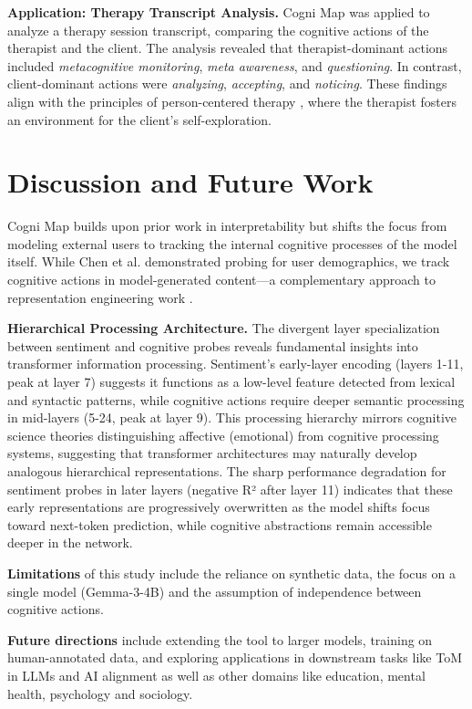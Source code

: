 \documentclass[letterpaper]{article}
\begin{document}
\textbf{Application: Therapy Transcript Analysis.} Cogni Map was applied to analyze a therapy session transcript, comparing the cognitive actions of the therapist and the client. The analysis revealed that therapist-dominant actions included \textit{metacognitive monitoring}, \textit{meta awareness}, and \textit{questioning}. In contrast, client-dominant actions were \textit{analyzing}, \textit{accepting}, and \textit{noticing}. These findings align with the principles of person-centered therapy \cite{rogers1951client}, where the therapist fosters an environment for the client's self-exploration.

\section{Discussion and Future Work}

Cogni Map builds upon prior work in interpretability \cite{alain2016understanding,chen2024designing} but shifts the focus from modeling external users to tracking the internal cognitive processes of the model itself. While Chen et al. demonstrated probing for user demographics, we track cognitive actions in model-generated content—a complementary approach to representation engineering work \cite{zou2023representation}.

\textbf{Hierarchical Processing Architecture.} The divergent layer specialization between sentiment and cognitive probes reveals fundamental insights into transformer information processing. Sentiment's early-layer encoding (layers 1-11, peak at layer 7) suggests it functions as a low-level feature detected from lexical and syntactic patterns, while cognitive actions require deeper semantic processing in mid-layers (5-24, peak at layer 9). This processing hierarchy mirrors cognitive science theories distinguishing affective (emotional) from cognitive processing systems, suggesting that transformer architectures may naturally develop analogous hierarchical representations. The sharp performance degradation for sentiment probes in later layers (negative R² after layer 11) indicates that these early representations are progressively overwritten as the model shifts focus toward next-token prediction, while cognitive abstractions remain accessible deeper in the network.

\textbf{Limitations} of this study include the reliance on synthetic data, the focus on a single model (Gemma-3-4B) and the assumption of independence between cognitive actions.

\textbf{Future directions} include extending the tool to larger models, training on human-annotated data, and exploring applications in downstream tasks like ToM in LLMs and AI alignment as well as other domains like education, mental health, psychology and sociology.
\end{document}
